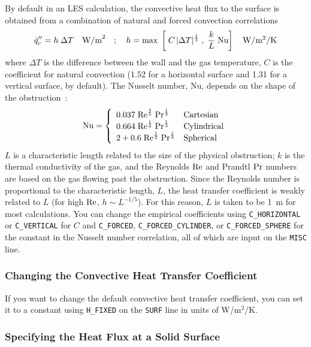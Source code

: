 \documentclass[11pt]{book}
\newcommand{\ct}{\tt\small}
\newcommand{\dq}{\dot{q}}
\newcommand{\ha}{\frac{1}{2}}
\newcommand{\ot}{\frac{1}{3}}
\newcommand{\fofi}{\frac{4}{5}}
\newcommand{\be}{\begin{equation}}
\newcommand{\ee}{\end{equation}}
\newcommand{\RE}{\hbox{Re}}
\newcommand{\PR}{\hbox{Pr}}
\newcommand{\NU}{\hbox{Nu}}
\begin{document}
By default in an LES calculation, the convective heat flux to the surface is
obtained from a combination of natural and forced
convection correlations
\be \dq_c'' = h \; \Delta T
    \quad \hbox{W/m}^2 \quad ; \quad h =
    \max \; \left[ \; C \, |\Delta T|^\ot \; , \;
            \frac{k}{L} \; \NU
            \right]  \quad
    \hbox{W/m$^2$/K} \ee
where $\Delta T$ is the difference between the wall and the gas temperature,
$C$ is the coefficient for natural convection (1.52 for a horizontal surface
and 1.31 for a vertical surface, by default). The Nusselt number, Nu, depends on the shape of the obstruction~\cite{Holman:1}:
\be \NU = \left\{ \begin{array}{ll} 0.037 \; \RE^\fofi \; \PR^\ot & \hbox{Cartesian} \\
                                    0.664 \; \RE^\ha \; \PR^\ot & \hbox{Cylindrical} \\
                                    2 + 0.6 \; \RE^\ha \; \PR^\ot & \hbox{Spherical} \end{array} \right. \ee
$L$ is a characteristic length related to the size of the physical
obstruction; $k$ is the thermal conductivity of the
gas, and the Reynolds $\RE$ and Prandtl $\PR$ numbers are based on the
gas flowing past the obstruction. Since the Reynolds number is proportional to the
characteristic length, $L$, the heat transfer coefficient is weakly
related to $L$ (for high $\RE$, $h \sim L^{-1/5}$). For this reason, $L$ is taken to be 1~m for most
calculations. You can change the empirical coefficients using {\ct C\_HORIZONTAL} or {\ct C\_VERTICAL} for $C$ and
{\ct C\_FORCED}, {\ct C\_FORCED\_CYLINDER}, or {\ct C\_FORCED\_SPHERE} for the constant in the Nusselt number correlation, all of which are input on the {\ct MISC} line.

\subsubsection{Changing the Convective Heat Transfer Coefficient}

If you want to change the default convective heat transfer coefficient, you can set it to a constant using
{\ct H\_FIXED} on the {\ct SURF} line in units of W/m$^2$/K.

\subsubsection{Specifying the Heat Flux at a Solid Surface}
\end{document}
